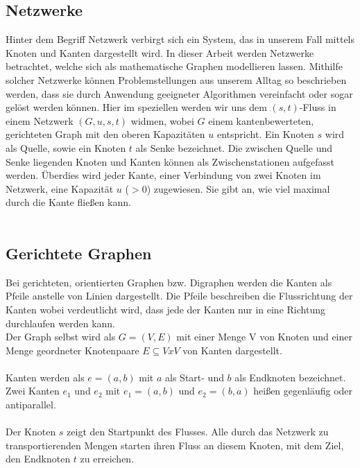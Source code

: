 \documentclass[a4paper]{llncs}
\begin{document}
\subsection{Netzwerke}
\label{Netzwerke}
Hinter dem Begriff Netzwerk verbirgt sich ein System, das in unserem Fall mittels Knoten und Kanten dargestellt wird. In dieser Arbeit werden Netz\-werke betrachtet, welche sich als mathematische Graphen modellieren lassen. Mithilfe solcher Netzwerke können Problemstellungen aus unserem Alltag so beschrieben werden, dass sie durch Anwendung geeigneter Algorithmen ver\-einfacht oder sogar gelöst werden können. Hier im speziellen werden wir uns dem $(s,t)$-Fluss in einem Netzwerk $(G,u,s,t)$ widmen, wobei  $G$ einem kanten\-bewerteten, gerichteten Graph mit den oberen Kapazitäten $u$ entspricht. Ein Knoten $s$ wird als Quelle, sowie ein Knoten $t$ als Senke bezeichnet. Die zwischen Quelle und Senke liegenden Knoten und Kanten können als Zwischenstationen aufgefasst werden. Überdies wird jeder Kante, einer Verbindung von zwei Knoten im Netzwerk, eine Kapazität $u$ ($>0$) zugewiesen. Sie gibt an, wie viel maximal durch die Kante fließen kann.\\ \\
\citep{Optimierungsmodell}

\subsection{Gerichtete Graphen}
\label{Graph}
Bei gerichteten, orientierten Graphen bzw. Digraphen werden die Kanten als Pfeile anstelle von Linien dargestellt. Die Pfeile beschreiben die Flussrichtung der Kanten wobei verdeutlicht wird, dass jede der Kanten nur in eine Richtung durchlaufen werden kann.\\

Der Graph selbst wird als
$G = (V,E)$ mit einer Menge V von Knoten und einer Menge
geordneter Knotenpaare $E \subseteq V x V$ von Kanten dargestellt.\\ \\
Kanten werden als 
$e = (a,b)$
mit $a$ als Start- und $b$ als Endknoten bezeichnet.
Zwei Kanten $e_{1}$ und $e_{2}$ mit 
$e_{1} = (a,b)$ und $e_{2} = (b,a)$
heißen gegenläufig oder antiparallel.\\ \\
Der Knoten $s$ zeigt den Startpunkt des Flusses. Alle durch das Netzwerk zu transportierenden Mengen starten ihren Fluss an diesem Knoten, mit dem Ziel, den Endknoten $t$ zu erreichen.\\ 
\end{document}
